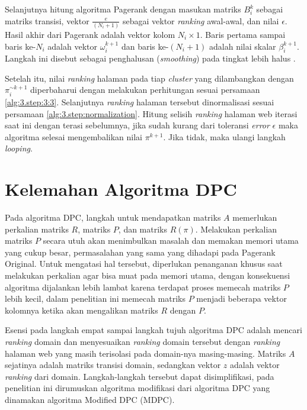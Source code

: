 Selanjutnya hitung algoritma Pagerank dengan masukan matriks $B^k_i$ sebagai matriks transisi, vektor $\frac{e}{(N_i + 1)}$ sebagai vektor \textit{ranking} awal-awal, dan nilai $\epsilon$. Hasil akhir dari Pagerank adalah vektor kolom $N_i \times 1$. Baris pertama sampai baris ke-$N_i$ adalah vektor $\omega^{k+1}_i$ dan baris ke-$(N_i + 1)$ adalah nilai skalar $\beta^{k+1}_i$. Langkah ini disebut sebagai penghalusan (\textit{smoothing}) pada tingkat lebih halus \citep{zhuetal2005distributedPagerank}.

Setelah itu, nilai \textit{ranking} halaman pada tiap \textit{cluster} yang dilambangkan dengan $\pi^{\sim k+1}_i$ diperbaharui dengan melakukan perhitungan sesuai persamaan \ref{alg:3.step:3:3}. Selanjutnya \textit{ranking} halaman tersebut dinormalisasi sesuai persamaan \ref{alg:3.step:normalization}. Hitung selisih \textit{ranking} halaman web iterasi saat ini dengan terasi sebelumnya, jika sudah kurang dari toleransi \textit{error} $\epsilon$ maka algoritma selesai mengembalikan nilai $\pi^{k+1}$. Jika tidak, maka ulangi langkah \textit{looping}.

\section{Kelemahan Algoritma DPC}

Pada algoritma DPC, langkah untuk mendapatkan matriks $A$ memerlukan perkalian matriks $R$, matriks $P$, dan matriks $R(\pi)$. Melakukan perkalian matriks $P$ secara utuh akan menimbulkan masalah dan memakan memori utama yang cukup besar, permasalahan yang sama yang dihadapi pada Pagerank Original. Untuk mengatasi hal tersebut, diperlukan penanganan khusus saat melakukan perkalian agar bisa muat pada memori utama, dengan konsekuensi algoritma dijalankan lebih lambat karena terdapat proses memecah matriks $P$ lebih kecil, dalam penelitian ini memecah matriks $P$ menjadi beberapa vektor kolomnya ketika akan mengalikan matriks $R$ dengan $P$.

Esensi pada langkah empat sampai langkah tujuh algoritma DPC adalah mencari \textit{ranking} domain dan menyesuaikan \textit{ranking} domain tersebut dengan \textit{ranking} halaman web yang masih terisolasi pada domain-nya masing-masing. Matriks $A$ sejatinya adalah matriks transisi domain, sedangkan vektor $z$ adalah vektor \textit{ranking} dari domain. Langkah-langkah tersebut dapat disimplifikasi, pada penelitian ini dirumuskan algoritma modifikasi dari algoritma DPC yang dinamakan algoritma Modified DPC (MDPC).

